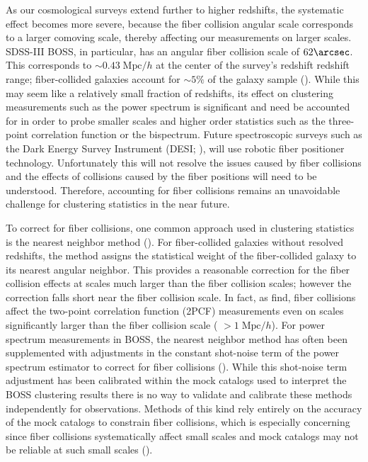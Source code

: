 \documentclass{emulateapj}
\begin{document}
As our cosmological surveys extend further to higher redshifts, the systematic effect becomes more severe, because the fiber collision angular scale corresponds to a larger comoving scale, thereby affecting our measurements on larger scales. SDSS-III BOSS, in particular, has an angular fiber collision scale of $62\arcsec$. This corresponds to $\sim 0.43 \;\mathrm{Mpc}/h$ at the center of the survey's redshift redshift range; fiber-collided galaxies account for $\sim 5\%$ of the galaxy sample (\citealt{Anderson:2012aa}). While this may seem like a relatively small fraction of redshifts, its effect on clustering measurements such as the power spectrum is significant and need be accounted for in order to probe smaller scales and higher order statistics such as the three-point correlation function or the bispectrum. Future spectroscopic surveys such as the Dark Energy Survey Instrument (DESI; \citealt{Schlegel:2011aa, Morales:2012aa, Makarem:2014aa}), will use robotic fiber positioner technology. Unfortunately this will not resolve the issues caused by fiber collisions and the effects of collisions caused by the fiber positions will need to be understood. Therefore, accounting for fiber collisions remains an unavoidable challenge for clustering statistics in the near future. 

To correct for fiber collisions, one common approach used in clustering statistics is the nearest neighbor method (\citealt{Zehavi:2002aa, Berlind:2006aa, Anderson:2012aa}). For fiber-collided galaxies without resolved redshifts, the method assigns the statistical weight of the fiber-collided galaxy to its nearest angular neighbor. This provides a reasonable correction for the fiber collision effects at scales much larger than the fiber collision scales; however the correction falls short near the fiber collision scale. In fact, as \cite{Zehavi:2005aa} find, fiber collisions affect the two-point correlation function (2PCF) measurements even on scales significantly larger than the fiber collision scale ( $> 1\;\mathrm{Mpc}/h$). For power spectrum measurements in BOSS, the nearest neighbor method has often been supplemented with adjustments in the constant shot-noise term of the power spectrum estimator to correct for fiber collisions (\citealt{Beutler:2014aa, Gil-Marin:2014aa}). While this shot-noise term adjustment has been calibrated within the mock catalogs used to interpret the BOSS clustering results there is no way to validate and calibrate these methods independently for observations. Methods of this kind rely entirely on the accuracy of the mock catalogs to constrain fiber collisions, which is especially concerning since fiber collisions systematically affect small scales and mock catalogs may not be reliable at such small scales (\citealt{Heitmann:2008aa, Schneider:2015aa}). 
\end{document}
